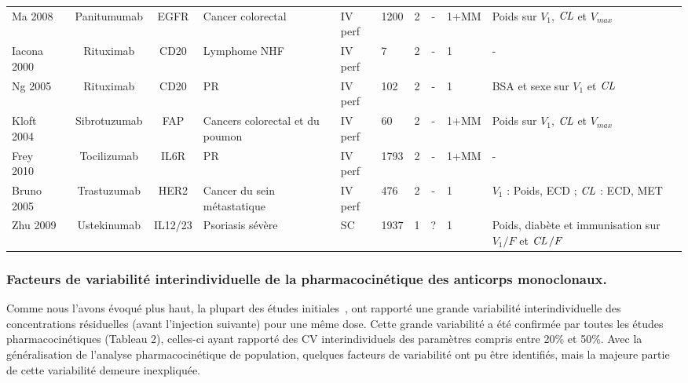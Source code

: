 \begin{table}[!ht]
\begin{tabular}{p{1.6cm}ccp{1.8cm}p{.8cm}p{.9cm}ccp{.9cm}l}
      Ma 2008~\citep{REF73} & Panitumumab & EGFR & Cancer colorectal & IV perf & 1200 & 2 & - & 1+MM & Poids sur $V_1$, $\operatorname{\textit{CL}}$ et $V_{max}$ \\
      Iacona 2000~\citep{REF51} & Rituximab & CD20 & Lymphome NHF & IV perf & 7 & 2 & - & 1 & - \\
      Ng 2005~\citep{REF52} & Rituximab & CD20 & PR & IV perf & 102 & 2 & - & 1 & BSA et sexe sur $V_1$ et $\operatorname{\textit{CL}}$ \\
      Kloft 2004~\citep{REF74} & Sibrotuzumab & FAP & Cancers colorectal et du poumon & IV perf & 60 & 2 & - & 1+MM & Poids sur $V_1$,  $\operatorname{\textit{CL}}$ et $V_{max}$ \\
      Frey 2010~\citep{REF75} & Tocilizumab & IL6R & PR & IV perf & 1793 & 2 & - & 1+MM & - \\
      Bruno 2005~\citep{REF76} & Trastuzumab & HER2 & Cancer du sein métastatique & IV perf & 476 & 2 & - & 1 & $V_1$ : Poids, ECD ; $\operatorname{\textit{CL}}$ : ECD, MET \\
      Zhu 2009~\citep{REF77} & Ustekinumab & IL12/23 & Psoriasis sévère & SC & 1937 & 1 & ? & 1 & Poids, diabète et immunisation sur $V_1/F$ et $\operatorname{\textit{CL}}/F$ \\
      \hline
    \end{tabular}
  \label{tab:2}
\end{table}

\subsubsection{Facteurs de variabilité interindividuelle de la pharmacocinétique des anticorps monoclonaux.}
Comme nous l'avons évoqué plus haut, la plupart des études initiales~\citep{REF53, REF54, REF58, REF60}, ont rapporté une grande variabilité interindividuelle des concentrations résiduelles (avant l'injection suivante) pour une même dose. Cette grande variabilité a été confirmée par toutes les études pharmacocinétiques (Tableau 2), celles-ci ayant rapporté des CV interindividuels des paramètres compris entre 20\% et 50\%. Avec la généralisation de l'analyse pharmacocinétique de population, quelques facteurs de variabilité ont pu être identifiés, mais la majeure partie de cette variabilité demeure inexpliquée.
